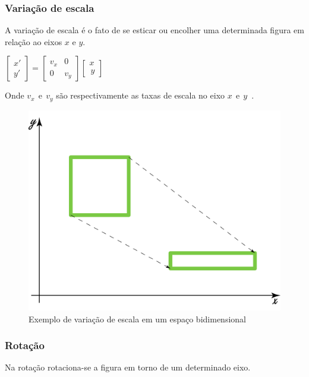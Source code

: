 \documentclass[9pt, a4paper, nofonttune, journal]{IEEEtran}
\begin{document}
\subsubsection{Variação de escala}

A variação de escala é o fato de se esticar ou encolher uma determinada figura em relação ao eixos $x$ e $y$.

\begin{center}
$\begin{bmatrix}x'\\
y'
\end{bmatrix}=\begin{bmatrix}v_{x} & 0\\
0 & v_{y}
\end{bmatrix}\begin{bmatrix}x\\
\frac{}{}y
\end{bmatrix}$\end{center}
Onde $v_{x}~~ \textrm{e} ~~ v_{y}$ são respectivamente as taxas de escala no eixo $x~~ \textrm{e} ~~y$~\cite{CGPPBook1}.

\begin{figure}[H]
\begin{center}
\includegraphics[scale=0.25]{figuras/scale1}
\caption{Exemplo de variação de escala em um espaço bidimensional}
\end{center}
\end{figure}

\subsubsection{Rotação}
Na rotação rotaciona-se a figura em torno de um determinado eixo.
\end{document}
